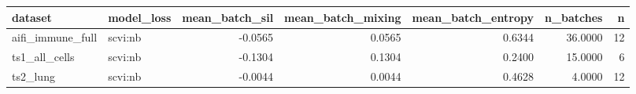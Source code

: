\begin{tabular}{llrrrrr}
\toprule
dataset & model\_loss & mean\_batch\_sil & mean\_batch\_mixing & mean\_batch\_entropy & n\_batches & n \\
\midrule
aifi\_immune\_full & scvi:nb & -0.0565 & 0.0565 & 0.6344 & 36.0000 & 12 \\
ts1\_all\_cells & scvi:nb & -0.1304 & 0.1304 & 0.2400 & 15.0000 & 6 \\
ts2\_lung & scvi:nb & -0.0044 & 0.0044 & 0.4628 & 4.0000 & 12 \\
\bottomrule
\end{tabular}
